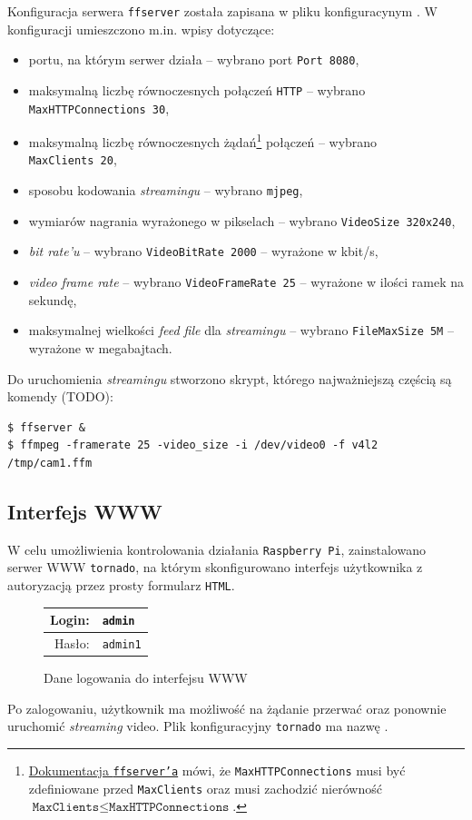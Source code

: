 \documentclass{article}
\begin{document}
Konfiguracja serwera \texttt{ffserver} została zapisana w pliku konfiguracynym . W konfiguracji umieszczono m.in. wpisy dotyczące:
\begin{itemize}
	\item portu, na którym serwer działa -- wybrano port \texttt{Port~8080},
	\item maksymalną liczbę równoczesnych połączeń \texttt{HTTP} -- wybrano \texttt{MaxHTTPConnections~30},
	\item maksymalną liczbę równoczesnych żądań\footnote{\href{https://www.ffmpeg.org/ffserver.html}{Dokumentacja \texttt{ffserver'a}} mówi, że \texttt{MaxHTTPConnections} musi być zdefiniowane przed \texttt{MaxClients} oraz musi zachodzić nierówność $\texttt{MaxClients}\leq\texttt{MaxHTTPConnections}$.} połączeń -- wybrano \texttt{MaxClients~20},
	\item sposobu kodowania \emph{streamingu} -- wybrano \texttt{mjpeg},
	\item wymiarów nagrania wyrażonego w pikselach -- wybrano \texttt{VideoSize~320x240},
	\item \emph{bit rate'u} -- wybrano \texttt{VideoBitRate~2000} -- wyrażone w kbit/s,
	\item \emph{video frame rate} -- wybrano \texttt{VideoFrameRate 25} -- wyrażone w ilości ramek na sekundę,
	\item maksymalnej wielkości \emph{feed file} dla \emph{streamingu} -- wybrano \texttt{FileMaxSize~5M} -- wyrażone w megabajtach.
\end{itemize}

Do uruchomienia \emph{streamingu} stworzono skrypt, którego najważniejszą częścią są komendy (TODO):
\begin{verbatim}
$ ffserver &
$ ffmpeg -framerate 25 -video_size -i /dev/video0 -f v4l2 /tmp/cam1.ffm
\end{verbatim}


\subsection{Interfejs WWW}
\label{sec:www}

W celu umożliwienia kontrolowania działania \texttt{Raspberry~Pi}, zainstalowano serwer WWW \texttt{tornado}, na którym skonfigurowano interfejs użytkownika z autoryzacją przez prosty formularz \texttt{HTML}.
\begin{figure}[H]
\centering
\begin{tabular}{r|l}
Login: & \texttt{admin}\\
\hline
Hasło: & \texttt{admin1}\\
\end{tabular}
\caption{Dane logowania do interfejsu WWW}
\end{figure}
Po zalogowaniu, użytkownik ma możliwość na żądanie przerwać oraz ponownie uruchomić \emph{streaming} video. Plik konfiguracyjny \texttt{tornado} ma nazwę .
\end{document}
